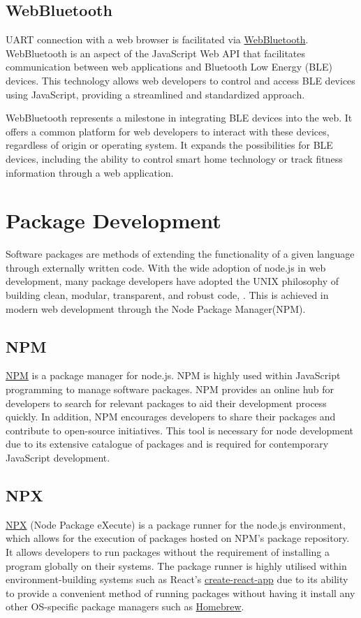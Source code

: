 \documentclass{l4proj}
\begin{document}
\subsection{WebBluetooth}
\text UART connection with a web browser is facilitated via \href{https://developer.mozilla.org/en-US/docs/Web/API/Web_Bluetooth_API}{WebBluetooth}. WebBluetooth is an aspect of the JavaScript Web API that facilitates communication between web applications and Bluetooth Low Energy (BLE) devices. This technology allows web developers to control and access BLE devices using JavaScript, providing a streamlined and standardized approach.

WebBluetooth represents a milestone in integrating BLE devices into the web. It offers a common platform for web developers to interact with these devices, regardless of origin or operating system. It expands the possibilities for BLE devices, including the ability to control smart home technology or track fitness information through a web application.

\section{Package Development}

Software packages are methods of extending the functionality of a given language through externally written code. With the wide adoption of node.js in web development, many package developers have adopted the UNIX philosophy of building clean, modular, transparent, and robust code, \cite{TheArtOfUNIXProgramming}. This is achieved in modern web development through the Node Package Manager(NPM).

\subsection{NPM}
\href{https://www.npmjs.com/}{NPM} is a package manager for node.js. NPM is highly used within JavaScript programming to manage software packages. NPM provides an online hub for developers to search for relevant packages to aid their development process quickly. In addition, NPM encourages developers to share their packages and contribute to open-source initiatives. This tool is necessary for node development due to its extensive catalogue of packages and is required for contemporary JavaScript development.

\subsection{NPX}
\href{https://docs.npmjs.com/cli/v7/commands/npx}{NPX} (Node Package eXecute) is a package runner for the node.js environment, which allows for the execution of packages hosted on NPM's package repository. It allows developers to run packages without the requirement of installing a program globally on their systems. The package runner is highly utilised within environment-building systems such as React's \href{https://reactjs.org/docs/create-a-new-react-app.html}{create-react-app} due to its ability to provide a convenient method of running packages without having it install any other OS-specific package managers such as \href{https://brew.sh/}{Homebrew}.
\end{document}
